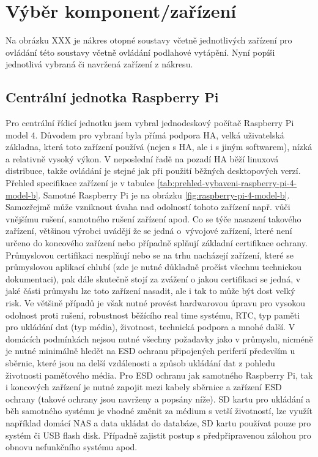 \chapter{Výběr komponent/zařízení}

Na obrázku XXX je nákres otopné soustavy včetně  jednotlivých zařízení pro ovládání této soustavy včetně ovládání podlahové vytápění. Nyní popíši jednotlivá vybraná či navržená zařízení z nákresu.


\section{Centrální jednotka Raspberry Pi}
Pro centrální řídicí jednotku jsem vybral jednodeskový počítač Raspberry Pi model 4. Důvodem pro vybraní byla přímá podpora HA, velká uživatelská základna, která toto zařízení používá (nejen s HA, ale i s jiným softwarem), nízká a relativně vysoký výkon. V neposlední řadě na pozadí HA běží linuxová distribuce, takže ovládání je stejné jak při použití běžných desktopových verzí. Přehled specifikace zařízení je v tabulce \ref{tab:prehled-vybaveni-raspberry-pi-4-model-b}. Samotné Raspberry Pi je na obrázku \ref{fig:raspberry-pi-4-model-b}. Samozřejmě může vzniknout úvaha nad odolností tohoto zařízení např. vůči vnějšímu rušení, samotného rušení zařízení apod. Co se týče nasazení takového zařízení, většinou výrobci uvádějí že se jedná o~vývojové zařízení, které není určeno do koncového zařízení nebo případně splňují  základní certifikace ochrany. Průmyslovou certifikaci nesplňují nebo se na trhu nacházejí zařízení, které se průmyslovou aplikací chlubí (zde je nutné důkladně pročíst všechnu technickou dokumentaci), pak dále skutečně stojí za zvážení o jakou certifikaci se jedná, v jaké části průmyslu lze toto zařízení nasadit, ale i tak to může být dost velký risk. Ve většině případů je však nutné provést hardwarovou úpravu pro vysokou odolnost proti rušení, robustnost běžícího real time systému, RTC, typ paměti pro ukládání dat (typ média), životnost, technická podpora a mnohé další. V domácích podmínkách nejsou nutné všechny požadavky jako v průmyslu, nicméně je nutné minimálně hledět na ESD ochranu připojených periferií především u sběrnic, které jsou na delší vzdálenosti a způsob ukládání dat z pohledu životnosti paměťového média. Pro ESD ochranu jak samotného Raspberry Pi, tak i koncových zařízení je nutné zapojit mezi kabely sběrnice a zařízení ESD ochrany (takové ochrany jsou navrženy a popsány níže). SD kartu pro ukládání a běh samotného systému je vhodné změnit za médium s vetší životností, lze využít například domácí NAS a data ukládat do databáze, SD kartu používat pouze pro systém či USB flash disk. Případně zajistit postup s předpřipravenou zálohou pro obnovu nefunkčního systému apod. 


